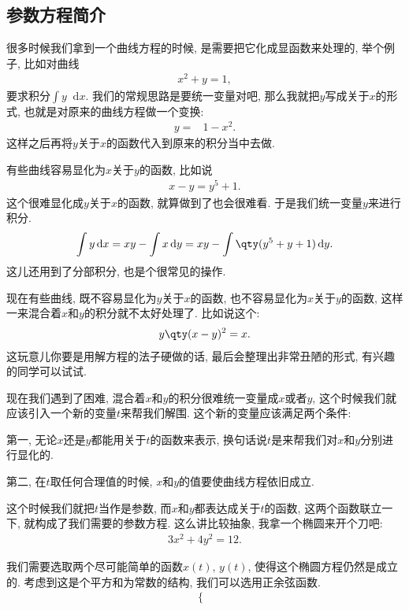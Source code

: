 \documentclass{ctexbook}
\newcommand*{\dif}{\mathop{}\!\mathrm{d}}
\begin{document}
{\subsection{参数方程简介}
很多时候我们拿到一个曲线方程的时候, 是需要把它化成显函数来处理的, 举个例子, 比如对曲线
\begin{align*}
x^{2}+y=1
,\end{align*}
要求积分$\int y\dif{x}$. 我们的常规思路是要统一变量对吧, 那么我就把$y$写成关于$x$的形式, 也就是对原来的曲线方程做一个变换: 
\begin{align*}
y={}&1-x^{2}
.\end{align*}
这样之后再将$y$关于$x$的函数代入到原来的积分当中去做. \par
有些曲线容易显化为$x$关于$y$的函数, 比如说
\begin{align*}
x-y=y^{5}+1
.\end{align*}
这个很难显化成$y$关于$x$的函数, 就算做到了也会很难看. 于是我们统一变量$y$来进行积分. 
\begin{align*}
\int y\dif{x}=xy-\int x\dif{y}=xy-\int\qty(y^{5}+y+1)\dif{y}
.\end{align*}
这儿还用到了分部积分, 也是个很常见的操作. \par
现在有些曲线, 既不容易显化为$y$关于$x$的函数, 也不容易显化为$x$关于$y$的函数, 这样一来混合着$x$和$y$的积分就不太好处理了. 比如说这个: 
\begin{align*}
y\qty(x-y)^{2}=x
.\end{align*}
这玩意儿你要是用解方程的法子硬做的话, 最后会整理出非常丑陋的形式, 有兴趣的同学可以试试. \par
现在我们遇到了困难, 混合着$x$和$y$的积分很难统一变量成$x$或者$y$, 这个时候我们就应该引入一个新的变量$t$来帮我们解围. 这个新的变量应该满足两个条件: \par
第一, 无论$x$还是$y$都能用关于$t$的函数来表示, 换句话说$t$是来帮我们对$x$和$y$分别进行显化的. \par
第二, 在$t$取任何合理值的时候, $x$和$y$的值要使曲线方程依旧成立. \par
这个时候我们就把$t$当作是参数, 而$x$和$y$都表达成关于$t$的函数, 这两个函数联立一下, 就构成了我们需要的参数方程. 这么讲比较抽象, 我拿一个椭圆来开个刀吧: 
\begin{align*}
3x^{2}+4y^{2}=12
.\end{align*}\par
我们需要选取两个尽可能简单的函数$x(t),\,y(t)$, 使得这个椭圆方程仍然是成立的. 考虑到这是个平方和为常数的结构, 我们可以选用正余弦函数. 
\begin{align*}
\begin{cases}

\end{cases}
\end{align*}}
\end{document}
